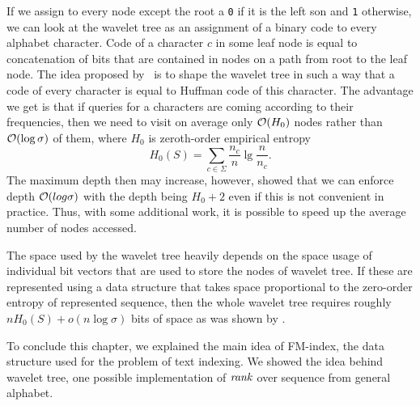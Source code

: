 If we assign to every node except the root a {\tt 0} if it is the left son and {\tt 1}
otherwise, we can look at the wavelet tree as an assignment of a binary code to every
alphabet character. Code of a character $c$ in some leaf node is equal to concatenation of
bits that are contained in nodes on a path from root to the leaf node. The idea proposed
by~\cite{makinen2005succinct} is to shape the wavelet tree in such a way that a code of every
character is equal to Huffman code of this character. The advantage we get is that if queries
for a characters are coming according to their frequencies, then we need to visit on average
only $\mathcal{O}(H_0)$ nodes rather than $\mathcal{O}(\log \sigma)$ of them, where $H_0$ is zeroth-order empirical
entropy $$H_0(S)=\sum_{c\in\Sigma} \frac{n_c}{n} \lg \frac{n}{n_c}.$$ The maximum depth then
may increase, however, \cite{grabowski2004first} showed that we can enforce depth
$\mathcal{O}(log \sigma)$ with the depth being $H_0+2$ even if this is not convenient in practice.
Thus, with some additional work, it is possible to speed up the average number of nodes accessed.

The space used by the wavelet tree heavily depends on the space usage of individual bit vectors
that are used to store the nodes of wavelet tree. If these are represented using a data structure
that takes space proportional to the zero-order entropy of represented sequence, then the whole
wavelet tree requires roughly $nH_0(S) + o(n\log\sigma)$ bits of space as was shown by
\cite{grossi2003high}.

To conclude this chapter, we explained the main idea of FM-index, the data structure used for the
problem of text indexing. We showed the idea behind wavelet tree, one possible implementation of
$\mathit{rank}$ over sequence from general alphabet.


